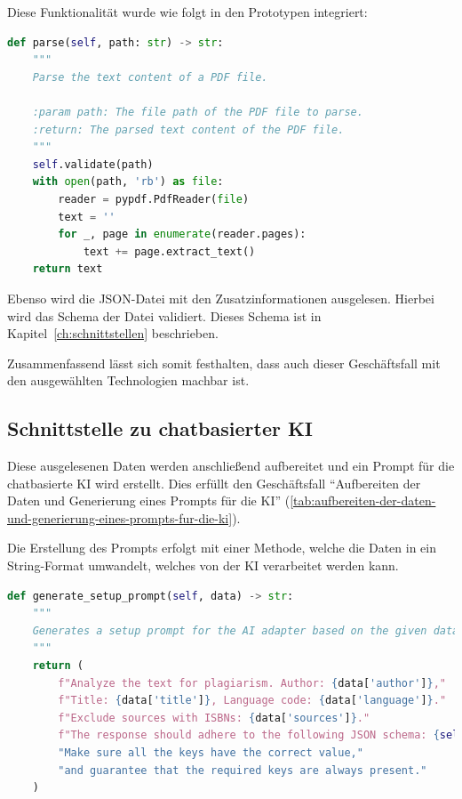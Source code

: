 Diese Funktionalität wurde wie folgt in den Prototypen integriert:
\begin{lstlisting}[caption={Auslesen von PDF-Dateien},captionpos=b,label={lst:pypdf}, language=Python, breaklines=true]
def parse(self, path: str) -> str:
    """
    Parse the text content of a PDF file.

    :param path: The file path of the PDF file to parse.
    :return: The parsed text content of the PDF file.
    """
    self.validate(path)
    with open(path, 'rb') as file:
        reader = pypdf.PdfReader(file)
        text = ''
        for _, page in enumerate(reader.pages):
            text += page.extract_text()
    return text
\end{lstlisting}

Ebenso wird die JSON-Datei mit den Zusatzinformationen ausgelesen.
Hierbei wird das Schema der Datei validiert.
Dieses Schema ist in Kapitel~\ref{ch:schnittstellen} beschrieben.

Zusammenfassend lässt sich somit festhalten, dass auch dieser Geschäftsfall mit den ausgewählten Technologien machbar ist.

\subsection{Schnittstelle zu chatbasierter KI}\label{subsec:schnittstelle-zu-chatbasierter-ki}
Diese ausgelesenen Daten werden anschließend aufbereitet und ein Prompt für die chatbasierte KI wird erstellt.
Dies erfüllt den Geschäftsfall ``Aufbereiten der Daten und Generierung eines Prompts für die KI'' (\ref{tab:aufbereiten-der-daten-und-generierung-eines-prompts-fur-die-ki}).

Die Erstellung des Prompts erfolgt mit einer Methode, welche die Daten in ein String-Format umwandelt,
welches von der KI verarbeitet werden kann.
\begin{lstlisting}[caption={Erstellung eines Prompts für die KI},captionpos=b,label={lst:prompt-erstellen}, language=Python, breaklines=true]
def generate_setup_prompt(self, data) -> str:
    """
    Generates a setup prompt for the AI adapter based on the given data.
    """
    return (
        f"Analyze the text for plagiarism. Author: {data['author']},"
        f"Title: {data['title']}, Language code: {data['language']}."
        f"Exclude sources with ISBNs: {data['sources']}."
        f"The response should adhere to the following JSON schema: {self.schema}"
        "Make sure all the keys have the correct value,"
        "and guarantee that the required keys are always present."
    )
\end{lstlisting}

